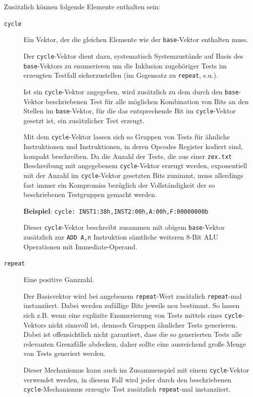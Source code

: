 \documentclass[ngerman, cd=lightcolor]{tudscrreprt}
\begin{document}
Zusätzlich können folgende Elemente enthalten sein:

\begin{description}
\item[\texttt{cycle}] Ein Vektor, der die gleichen Elemente wie der
\texttt{base}-Vektor enthalten muss.

Der \texttt{cycle}-Vektor dient dazu, systematisch Systemzustände auf Basis des
\texttt{base}-Vektors zu enumerieren um die Inklusion zugehöriger Tests im
erzeugten Testfall sicherzustellen (im Gegensatz zu \texttt{repeat}, s.u.).

Ist ein \texttt{cycle}-Vektor angegeben, wird zusätzlich zu dem durch den
\texttt{base}-Vektor beschriebenen Test für alle möglichen Kombination von Bits
an den Stellen im \texttt{base}-Vektor, für die das entsprechende Bit im
\texttt{cycle}-Vektor gesetzt ist, ein zusätzlicher Test erzeugt.

Mit dem \texttt{cycle}-Vektor lassen sich so Gruppen von Tests für ähnliche
Instruktionen und Instruktionen, in deren Opcodes Register kodiert sind, kompakt
beschreiben. Da die Anzahl der Tests, die aus einer \texttt{zex.txt}
Beschreibung mit angegebenem \texttt{cycle}-Vektor erzeugt werden, exponentiell
mit der Anzahl im \texttt{cycle}-Vektor gesetzten Bits zunimmt, muss allerdings
fast immer ein Kompromiss bezüglich der Vollständigkeit der so beschriebenen
Testgruppen gemacht werden.

\textbf{Beispiel}: \texttt{cycle: INST1:38h,INST2:00h,A:00h,F:00000000b}

Dieser \texttt{cycle}-Vektor beschreibt zusammen mit obigem
\texttt{base}-Vektor zusätzlich zur \texttt{ADD A,n} Instruktion sämtliche
weiteren 8-Bit ALU Operationen mit Immediate-Operand.

\item[\texttt{repeat}] Eine positive Ganzzahl.

Der Basisvektor wird bei angebenem \texttt{repeat}-Wert zusätzlich
\texttt{repeat}-mal instanziiert. Dabei werden zufällige Bits jeweils neu
bestimmt. So lassen sich z.B. wenn eine explizite Enumerierung von Tests
mittels eines \texttt{cycle}-Vektors nicht sinnvoll ist, dennoch Gruppen
ähnlicher Tests generieren. Dabei ist offensichtlich nicht garantiert, dass die
so generierten Tests alle relevanten Grenzfälle abdecken, daher sollte eine
ausreichend große Menge von Tests generiert werden.

Dieser Mechanismus kann auch im Zusammenspiel mit einem \texttt{cycle}-Vektor
verwendet werden, in diesem Fall wird jeder durch den beschriebenen
\texttt{cycle}-Mechanismus erzeugte Test zusätzlich \texttt{repeat}-mal
instanziiert.


\end{description}
\end{document}
